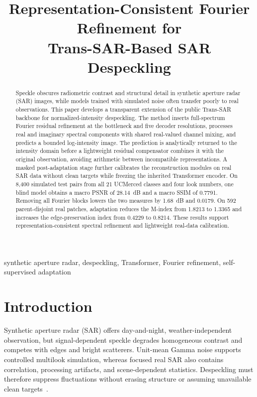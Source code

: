 \documentclass[conference]{IEEEtran}
\begin{document}
\title{Representation-Consistent Fourier Refinement for\\
Trans-SAR-Based SAR Despeckling}

\author{}

\maketitle

\begin{abstract}
Speckle obscures radiometric contrast and structural detail in synthetic aperture radar (SAR) images, while models trained with simulated noise often transfer poorly to real observations. This paper develops a transparent extension of the public Trans-SAR backbone for normalized-intensity despeckling. The method inserts full-spectrum Fourier residual refinement at the bottleneck and five decoder resolutions, processes real and imaginary spectral components with shared real-valued channel mixing, and predicts a bounded log-intensity image. The prediction is analytically returned to the intensity domain before a lightweight residual compensator combines it with the original observation, avoiding arithmetic between incompatible representations. A masked post-adaptation stage further calibrates the reconstruction modules on real SAR data without clean targets while freezing the inherited Transformer encoder. On 8,400 simulated test pairs from all 21 UCMerced classes and four look numbers, one blind model obtains a macro PSNR of 28.14~dB and a macro SSIM of 0.7791. Removing all Fourier blocks lowers the two measures by 1.68~dB and 0.0179. On 592 parent-disjoint real patches, adaptation reduces the M-index from 1.8213 to 1.3365 and increases the edge-preservation index from 0.4229 to 0.8214. These results support representation-consistent spectral refinement and lightweight real-data calibration.
\end{abstract}

\begin{IEEEkeywords}
synthetic aperture radar, despeckling, Transformer, Fourier refinement, self-supervised adaptation
\end{IEEEkeywords}

\section{Introduction}
Synthetic aperture radar (SAR) offers day-and-night, weath\-er-independent observation, but signal-dependent speckle degrades homogeneous contrast and competes with edges and bright scatterers. Unit-mean Gamma noise supports controlled multilook simulation, whereas focused real SAR also contains correlation, processing artifacts, and scene-dependent statistics. Despeckling must therefore suppress fluctuations without erasing structure or assuming unavailable clean targets~\cite{fracastoro2021overview}.
\end{document}
